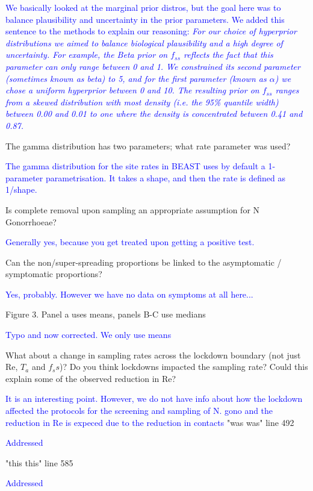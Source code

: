 \documentclass[pdflatex,sn-nature]{sn-jnl}%
\begin{document}
\textcolor{blue}{We basically looked at the marginal prior distros, but the goal here was to balance plausibility and uncertainty in the prior parameters. We added this sentence to the methods to explain our reasoning:\textit{ 
For our choice of hyperprior distributions we aimed to balance biological plausibility and a high degree of uncertainty. For example, the Beta prior on $f_{ss}$ reflects the fact that this parameter can only range between 0 and 1. We constrained its second parameter (sometimes known as \textit{beta}) to 5, and for the first parameter (known as $\alpha$) we chose a uniform hyperprior between 0 and 10. The resulting prior on $f_{ss}$ ranges from a skewed distribution with most density (i.e. the 95\% quantile width) between 0.00 and 0.01 to one where the density is concentrated between 0.41 and 0.87.}}

The gamma distribution has two parameters; what rate parameter was used?

\textcolor{blue}{The gamma distribution for the site rates in BEAST uses by default a 1-parameter parametrisation. It takes a shape, and then the rate is defined as 1/shape.}

Is complete removal upon sampling an appropriate assumption for N Gonorrhoeae?

\textcolor{blue}{Generally yes, because you get treated upon getting a positive test.}

Can the non/super-spreading proportions be linked to the asymptomatic / symptomatic proportions?

\textcolor{blue}{Yes, probably. However we have no data on symptoms at all here...}

Figure 3. Panel a uses means, panels B-C use medians

\textcolor{blue}{Typo and now corrected. We only use means}

What about a change in sampling rates across the lockdown boundary (not just Re, $T_a$ and $f_ss$)? Do you think lockdowns impacted the sampling rate? Could this explain some of the observed reduction in Re?

\textcolor{blue}{It is an interesting point. However, we do not have info about how the lockdown affected the protocols for the screening and sampling of N. gono and the reduction in Re is expeced due to the reduction in contacts}
"was was" line 492

\textcolor{blue}{Addressed}

"this this" line 585

\textcolor{blue}{Addressed}
\end{document}

